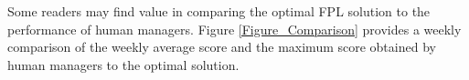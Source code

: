 Some readers may find value in comparing the optimal FPL solution to the performance of human managers. Figure \ref{Figure_Comparison} provides a weekly comparison of the weekly average score and the maximum score obtained by human managers to the optimal solution.

